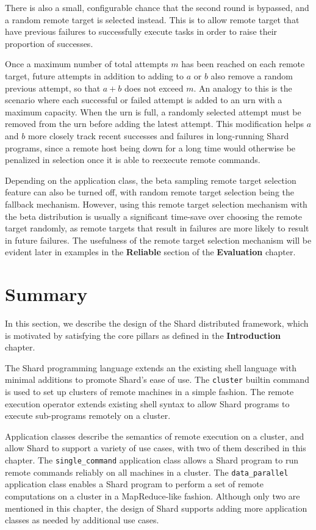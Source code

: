 \documentclass[twoside]{report}
\begin{document}
There is also a small, configurable chance that the second round is bypassed, and a random remote target is selected instead.
This is to allow remote target that have previous failures to successfully execute tasks in order to raise their proportion of successes.

Once a maximum number of total attempts $m$ has been reached on each remote target, future attempts in addition to adding to $a$ or $b$ also remove a random previous attempt, so that $a+b$ does not exceed $m$.
An analogy to this is the scenario where each successful or failed attempt is added to an urn with a maximum capacity.
When the urn is full, a randomly selected attempt must be removed from the urn before adding the latest attempt.
This modification helps $a$ and $b$ more closely track recent successes and failures in long-running Shard programs, since a remote host being down for a long time would otherwise be penalized in selection once it is able to reexecute remote commands.

Depending on the application class, the beta sampling remote target selection feature can also be turned off, with random remote target selection being the fallback mechanism.
However, using this remote target selection mechanism with the beta distribution is usually a significant time-save over choosing the remote target randomly, as remote targets that result in failures are more likely to result in future failures.
The usefulness of the remote target selection mechanism will be evident later in examples in the \textbf{Reliable} section of the \textbf{Evaluation} chapter.

\section{Summary}

In this section, we describe the design of the Shard distributed framework, which is motivated by satisfying the core pillars as defined in the \textbf{Introduction} chapter.

The Shard programming language extends an the existing shell language with minimal additions to promote Shard's ease of use.
The \texttt{cluster} builtin command is used to set up clusters of remote machines in a simple fashion.
The remote execution operator extends existing shell syntax to allow Shard programs to execute sub-programs remotely on a cluster.

Application classes describe the semantics of remote execution on a cluster, and allow Shard to support a variety of use cases, with two of them described in this chapter.
The \texttt{single\_command} application class allows a Shard program to run remote commands reliably on all machines in a cluster.
The \texttt{data\_parallel} application class enables a Shard program to perform a set of remote computations on a cluster in a MapReduce-like fashion.
Although only two are mentioned in this chapter, the design of Shard supports adding more application classes as needed by additional use cases.
\end{document}
